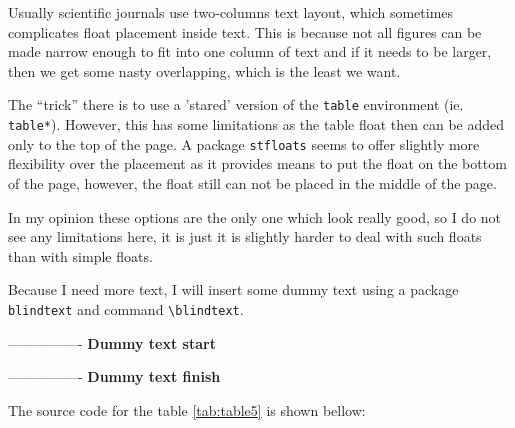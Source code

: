 \documentclass[a4paper,11pt]{article}
\begin{document}
\begin{multicols}{2}
    

    Usually scientific journals use two-columns text layout, which sometimes
    complicates float placement inside text. This is because not all figures can
    be made narrow enough to fit into one column of text and if it needs to be
    larger, then we get some nasty overlapping, which is the least we want.

    The ``trick'' there is to use a 'stared' version of the \verb|table|
    environment (ie. \verb|table*|). However, this has some limitations as the
    table float then can be added only to the top of the page. A package
    \verb|stfloats| seems to offer slightly more flexibility over the placement
    as it provides means to put the float on the bottom of the page, however,
    the float still can not be placed in the middle of the page.

    In my opinion these options are the only one which look really good, so I do
    not see any limitations here, it is just it is slightly harder to deal with
    such floats than with simple floats.

    Because I need more text, I will insert some dummy text using a package
    \verb|blindtext| and command \verb|\blindtext|.

    ----------------
    \textbf{Dummy text start}

    \blindtext

    \blindtext

    ----------------
    \textbf{Dummy text finish}
\end{multicols}

The source code for the table \ref{tab:table5} is shown bellow:

\end{document}
